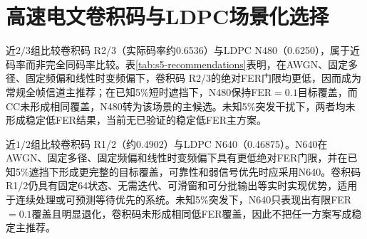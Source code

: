 \begin{table}[htbp]
  \centering\scriptsize
  \caption{LDPC最终推荐配置}
  \label{tab:final-ldpc-matrix}
\end{table}

\section{高速电文卷积码与LDPC场景化选择}

近$2/3$组比较卷积码 R2/3（实际码率约0.6536）与LDPC N480（0.6250），属于近码率而非完全同码率比较。表\ref{tab:s5-recommendations}表明，在AWGN、固定多径、固定频偏和线性时变频偏下，卷积码 R2/3的绝对FER门限均更低，因而成为常规全帧信道主推荐；在已知5\%短时遮挡下，N480保持FER$=0.1$目标覆盖，而CC未形成相同覆盖，N480转为该场景的主候选。未知5\%突发干扰下，两者均未形成稳定低FER结果，当前无已验证的稳定低FER主方案。

近$1/2$组比较卷积码 R1/2（约0.4902）与LDPC N640（0.46875）。N640在AWGN、固定多径、固定频偏和线性时变频偏下具有更低绝对FER门限，并在已知5\%遮挡下形成更完整的目标覆盖，可靠性和弱信号优先时应采用N640。卷积码 R1/2仍具有固定64状态、无需迭代、可滑窗和可分批输出等实时实现优势，适用于连续处理或可预测等待优先的系统。未知5\%突发下，N640只表现出有限FER$=0.1$覆盖且明显退化，卷积码未形成相同低FER覆盖，因此不把任一方案写成稳定主推荐。

